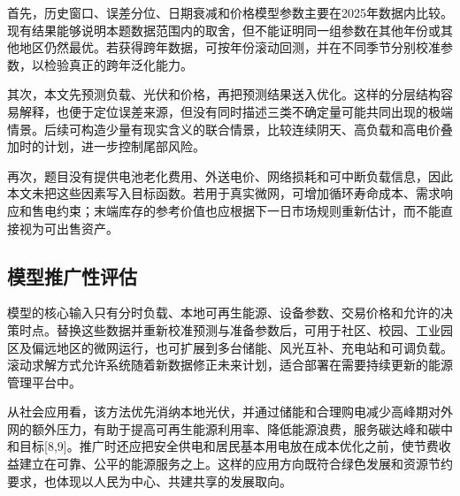 首先，历史窗口、误差分位、日期衰减和价格模型参数主要在2025年数据内比较。现有结果能够说明本题数据范围内的取舍，但不能证明同一组参数在其他年份或其他地区仍然最优。若获得跨年数据，可按年份滚动回测，并在不同季节分别校准参数，以检验真正的跨年泛化能力。

其次，本文先预测负载、光伏和价格，再把预测结果送入优化。这样的分层结构容易解释，也便于定位误差来源，但没有同时描述三类不确定量可能共同出现的极端情景。后续可构造少量有现实含义的联合情景，比较连续阴天、高负载和高电价叠加时的计划，进一步控制尾部风险。

再次，题目没有提供电池老化费用、外送电价、网络损耗和可中断负载信息，因此本文未把这些因素写入目标函数。若用于真实微网，可增加循环寿命成本、需求响应和售电约束；末端库存的参考价值也应根据下一日市场规则重新估计，而不能直接视为可出售资产。


\subsection{模型推广性评估}

模型的核心输入只有分时负载、本地可再生能源、设备参数、交易价格和允许的决策时点。替换这些数据并重新校准预测与准备参数后，可用于社区、校园、工业园区及偏远地区的微网运行，也可扩展到多台储能、风光互补、充电站和可调负载。滚动求解方式允许系统随着新数据修正未来计划，适合部署在需要持续更新的能源管理平台中。

从社会应用看，该方法优先消纳本地光伏，并通过储能和合理购电减少高峰期对外网的额外压力，有助于提高可再生能源利用率、降低能源浪费，服务碳达峰和碳中和目标[8,9]。推广时还应把安全供电和居民基本用电放在成本优化之前，使节费收益建立在可靠、公平的能源服务之上。这样的应用方向既符合绿色发展和资源节约要求，也体现以人民为中心、共建共享的发展取向。